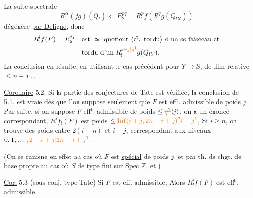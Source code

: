 La suite spectrale
\[
 R^\alpha_!(fg)(Q_l)\Longleftarrow E_2^{pq}=R^p_!f(R^q_!g(Q_{lX}))
\]
dégénère \uline{par Deligne}, donc
\[
\begin{aligned}
 R^i_!f(F)=E^{ij}_2\quad &\text{est }\simeq\text{ quotient \inserted{c$^{\mathrm t}$. tordu} d'un ss-faisceau ct}\\
 &\text{tordu d'un }R^{i+\unsure{j|g}}_!g(Q_{lY}).
\end{aligned}
\]
\margin{[N.B. Voir si Deligne ne peut se remplacer ici par \uline{factorisation d'}\uline{Artin} sur $X\longrightarrow S$, pour revenir au cas de $n=1$\ldots]}
La conclusion en résulte, en utilisant le cas précédent pour $Y\longrightarrow S$, de dim relative $\leq n+j$ \ldots

\uline{Corollaire} 5.2. Si la partie  des conjectures de Tate est vérifiée, la conclusion de 5.1. est vraie dès que l'on suppose seulement que $F$ est eff$^{\mathrm t}$. admissible de poids $j$. Par suite, si on suppose $F$ eff$^{\mathrm t}$. admissible de poids $\leq\deleted{\unsure{q}}\inserted{j}$, on a un énoncé correspondant,  $R^if_!(F)$ est   poids $\leq\deleted{\unsure{\operatorname{Inf}(i+j,2n-i+j)}}\unsure{i+j}$,  Si $i\geq n$, on trouve des poids entre $2(i-n)$ et $i+j$, correspondant aux niveaux $0,1,\ldots,\unsure{2-i+j|2n-i+j}$.

(On se ramène en effet  au cas où $F$ est \uline{spécial} de poids $j$, et par th. de chgt. de base propre au cas où $S$ de type fini sur Spec $\mathbb Z$, et )

\uline{Cor.} 5.3 (sous conj. type Tate)  Si $F$ est eff. admissible, Alors $R^i_!f(F)$ est eff$^{\mathrm t}$. admissible.
